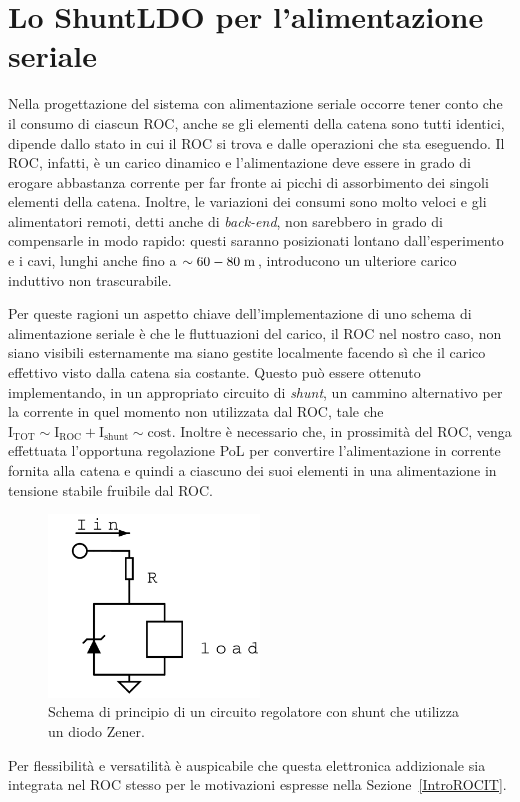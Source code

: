 \section{Lo ShuntLDO per l'alimentazione seriale}

Nella progettazione del sistema con alimentazione seriale occorre tener conto che il consumo di ciascun ROC, anche se gli elementi della catena sono tutti identici, dipende dallo stato in cui il ROC si trova e dalle operazioni che sta eseguendo. 
Il ROC, infatti, è un carico dinamico e l'alimentazione deve essere in grado di erogare abbastanza corrente per far fronte ai picchi di assorbimento dei singoli elementi della catena.
Inoltre, le variazioni dei consumi sono molto veloci e gli alimentatori remoti, detti anche di \textit{back-end}, non sarebbero in grado di compensarle in modo rapido: questi saranno posizionati lontano dall'esperimento e i cavi, lunghi anche fino a $\sim 60-80\rm \; m$, introducono un ulteriore carico induttivo non trascurabile.

Per queste ragioni un aspetto chiave dell'implementazione di uno schema di alimentazione seriale \`e che le fluttuazioni del carico, il ROC nel nostro caso, non siano visibili esternamente ma siano gestite localmente facendo s\`i che il carico effettivo visto dalla catena sia costante. Questo pu\`o essere ottenuto implementando, in un appropriato circuito di {\em shunt}, un cammino alternativo per la corrente in quel momento non utilizzata dal ROC, tale che $\mathrm{I}_\mathrm{TOT}\sim\mathrm{I}_\mathrm{ROC}+\mathrm{I}_\mathrm{shunt}\sim\mathrm{cost}$. Inoltre \`e necessario che, in prossimit\`a del ROC, venga effettuata l'opportuna regolazione PoL per convertire l'alimentazione in corrente fornita alla catena e quindi a ciascuno dei suoi elementi in una alimentazione in tensione stabile fruibile dal ROC. 
\begin{figure}
\centering
\includegraphics[width=0.5\textwidth]{Immagini/zener2}
\caption{Schema di principio di un circuito regolatore con shunt che utilizza un diodo Zener.}
\label{zener}
\end{figure}
Per flessibilit\`a e versatilit\`a \`e auspicabile che questa elettronica addizionale sia integrata nel ROC stesso per le motivazioni espresse nella Sezione~\ref{IntroROCIT}.

